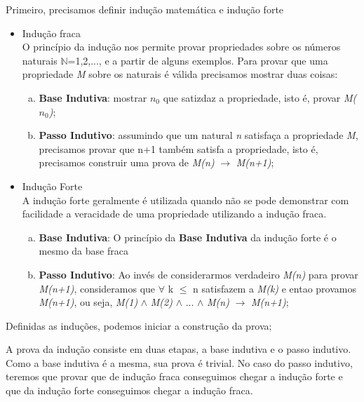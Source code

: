 \documentclass[a4paper, 10pt]{article}
\begin{document}
\vspace{5mm}Primeiro, precisamos definir indução matemática e indução forte
\begin{itemize}
\item Indução fraca\\ 
	O princípio da indução nos permite provar propriedades sobre os números naturais $\mathbb{N}$={1,2,...}, e a partir de alguns exemplos.
    Para provar que uma propriedade \textit{M} sobre os naturais é válida precisamos mostrar duas coisas:
    
	\begin{enumerate} [a)]	
    \item \textbf{Base Indutiva}: mostrar \textit{$n_0$} que satizdaz a propriedade, isto é, provar \textit{M(\textit{$n_0$})};
    \item \textbf{Passo Indutivo}: assumindo que um natural \textit{n} satisfaça a propriedade \textit{M}, precisamos provar que n+1 também satisfa a propriedade, isto é, precisamos construir uma prova de \textit{M(n)} $\rightarrow$ \textit{ M(n+1)};
	\end{enumerate}
    
\item Indução Forte\\
	A indução forte geralmente é utilizada quando não se pode demonstrar com facilidade a veracidade de uma propriedade utilizando a indução fraca.    
    \begin{enumerate}[a)]
    \item \textbf{Base Indutiva}: O princípio da \textbf{Base Indutiva} da indução forte é o mesmo da base fraca
    \item \textbf{Passo Indutivo}: Ao invés de considerarmos verdadeiro \textit{M(n)} para provar \textit{ M(n+1)}, consideramos que $\forall$ k $\le$ n satisfazem a \textit{M(k)} e entao provamos \textit{M(n+1)}, ou seja, \textit{M(1)} $\wedge$ \textit{M(2)} $\wedge$ ... $\wedge$ \textit{M(n)} $\rightarrow$ \textit{ M(n+1)};
    \end{enumerate}
\end{itemize}

Definidas as induções, podemos iniciar a construção da prova; 

A prova da indução consiste em duas etapas, a base indutiva e o passo indutivo.
Como a base indutiva é a mesma, sua prova é trivial.
No caso do passo indutivo, teremos que provar que de indução fraca conseguimos chegar a indução forte e que da indução forte conseguimos chegar a indução fraca.
\end{document}
